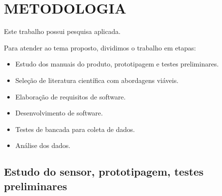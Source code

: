 \chapter{METODOLOGIA}\label{chap:metodologia}

Este trabalho possui pesquisa aplicada.

Para atender ao tema proposto, dividimos o trabalho em etapas:
\begin{itemize}
    \item Estudo dos manuais do produto, prototipagem e testes preliminares.
    \item Seleção de literatura científica com abordagens viáveis.
    \item Elaboração de requisitos de software.
    \item Desenvolvimento de software.
    \item Testes de bancada para coleta de dados.
    \item Análise dos dados.
\end{itemize}

\section{Estudo do sensor, prototipagem, testes preliminares}

